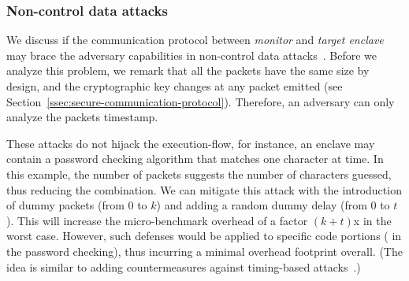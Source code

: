 

\subsubsection{Non-control data attacks}
\label{sssec:non-control-data}


We discuss if the communication protocol between \emph{monitor} and 
\emph{target enclave} may brace the adversary capabilities in non-control data 
attacks~\citep{269251,hu2015automatic}.
Before we analyze this problem, we remark that all the packets have the same 
size by design, and the cryptographic key changes at any packet emitted (see 
Section~\ref{ssec:secure-communication-protocol}).
Therefore, an adversary can only analyze the packets timestamp.

These attacks do not hijack the execution-flow, for instance, an enclave may 
contain a password checking algorithm that matches one character at time.
In this example, the number of packets suggests the number of characters 
guessed, thus reducing the combination.
We can mitigate this attack with the introduction of dummy packets (from $0$ to 
$k$) and adding a random dummy delay (from $0$ to $t$).
This will increase the micro-benchmark overhead of a factor $(k + t)$x in the 
worst case.
However, such defenses would be applied to specific code portions (\eg
in the password checking), thus incurring a minimal overhead footprint
overall.  (The idea is similar to adding countermeasures against
timing-based attacks~\citep{10.1007/978-3-642-25385-0_26}.)



